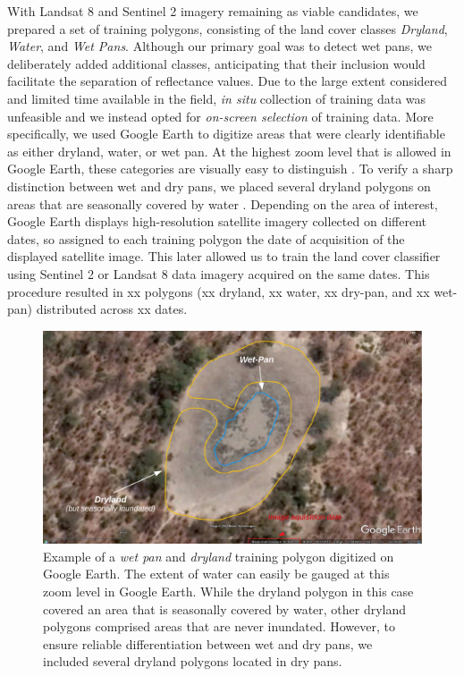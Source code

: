 \documentclass[abstract=off,10pt,a4paper,bibliography=totocnumbered]{article}
\begin{document}
With Landsat 8 and Sentinel 2 imagery remaining as viable candidates, we
prepared a set of training polygons, consisting of the land cover classes
\textit{Dryland}, \textit{Water}, and \textit{Wet Pans}. Although our primary
goal was to detect wet pans, we deliberately added additional classes,
anticipating that their inclusion would facilitate the separation of reflectance
values. Due to the large extent considered and limited time available in the
field, \textit{in situ} collection of training data was unfeasible and we
instead opted for \textit{on-screen selection} of training data. More
specifically, we used Google Earth to digitize areas that were clearly
identifiable as either dryland, water, or wet pan. At the highest zoom level
that is allowed in Google Earth, these categories are visually easy to
distinguish . To verify a sharp distinction between wet and dry
pans, we placed several dryland polygons on areas that are seasonally covered by
water . Depending on the area of interest, Google Earth
displays high-resolution satellite imagery collected on different dates, so
assigned to each training polygon the date of acquisition of the displayed
satellite image. This later allowed us to train the land cover classifier using
Sentinel 2 or Landsat 8 data imagery acquired on the same dates. This procedure
resulted in xx polygons (xx dryland, xx water, xx dry-pan, and xx wet-pan)
distributed across xx dates.

\begin{figure}[htbp]
 \begin{center}
  \includegraphics[width = \textwidth]{99_PanMapping.pdf}
  \caption{Example of a \textit{wet pan} and \textit{dryland} training polygon
  digitized on Google Earth. The extent of water can easily be gauged at this
  zoom level in Google Earth. While the dryland polygon in this case covered an
  area that is seasonally covered by water, other dryland polygons comprised
  areas that are never inundated. However, to ensure reliable differentiation
  between wet and dry pans, we included several dryland polygons located in dry
  pans.}
  \label{PanMapping}
 \end{center}
\end{figure}
\end{document}
